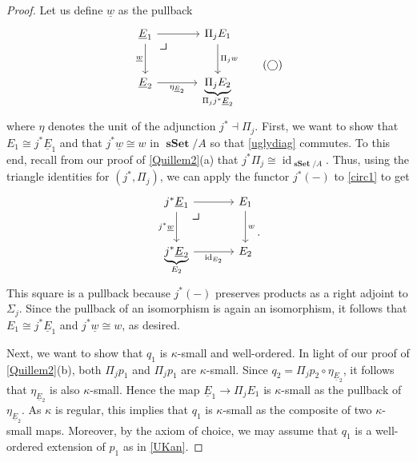 \documentclass[10pt,letterpaper,cm]{nupset}
\theoremstyle{definition}
\theoremstyle{theorem}
\theoremstyle{remark}
\newcommand{\0}{\mathbf{0}}
\newcommand{\1}{\mathbf{1}}
\newcommand{\2}{\mathbf{2}}
\DeclareMathOperator{\sset}{\mathbf{sSet}}
\DeclareMathOperator{\idd}{id}
\begin{document}
\begin{proof}
Let us define $\underline{w}$ as the pullback
\[ \label{circ1}
\begin{tikzcd}[row sep=large, column sep=large]
\underline{E}_1 \arrow[r] \arrow[d, "\underline{w}"'] \arrow[dr, phantom, "\scalebox{1.5}{\color{black}$\lrcorner$}" , very near start, color=black]
& \Pi_j{E_1} \arrow[d, "\Pi_j{w}"]             \\
\underline{E}_2 \arrow[r, "\eta_{\underline{E}_2}"']                 & \underbrace{\Pi_j{E_2}}_{\Pi_jj^{\ast}{\underline{E}_2}}
\end{tikzcd}  \tag{$\bigcirc$}
\] where $\eta$  denotes the unit of the adjunction $j^{\ast} \dashv \Pi_j$.
First, we want to show that $E_1 \cong j^{\ast}{\underline{E}_1}$ and that $j^{\ast}{\underline{w}} \cong w$ in $\sset/A$ so that \eqref{uglydiag} commutes. To this end, recall from our proof of \cref{Quillem2}(a) that $j^{\ast}{\Pi_j}\cong \idd_{\sset/A}$. Thus, using the triangle identities for $\left(j^{\ast}, \Pi_j\right)$, we can apply the functor $j^{\ast}({-})$ to \eqref{circ1} to get
\[
\begin{tikzcd}[row sep=large, column sep=large]
j^{\ast}{\underline{E}_1} \arrow[d, "j^{\ast}{\underline{w}}"'] \arrow[r]  \arrow[dr, phantom, "\scalebox{1.5}{\color{black}$\lrcorner$}" , very near start, color=black]
& E_1 \arrow[d, "w"] \\
\underbrace{j^{\ast}{\underline{E}_2}}_{E_2} \arrow[r, "\idd_{E_2}"']                      & E_2               
\end{tikzcd}
.\] This square is a pullback because $j^{\ast}({-})$ preserves products as a right adjoint to $\Sigma_j$. Since the pullback of an isomorphism is again an isomorphism, it follows that $E_1 \cong j^{\ast}{\underline{E}_1}$ and  $j^{\ast}{\underline{w}} \cong w$, as desired.

\medskip

Next, we want to show that  $q_1$ is $\kappa$-small and well-ordered. In light of our proof of \cref{Quillem2}(b), both $\Pi_j{p_1}$ and $\Pi_j{p_1}$ are $\kappa$-small. Since $q_2 = \Pi_j{p_2}\circ \eta_{\underline{E}_2}$, it follows that  $\eta_{\underline{E}_2}$ is also  $\kappa$-small. Hence the map $\underline{E}_1 \to \Pi_{j}{E_1}$ is $\kappa$-small as the pullback of  $\eta_{\underline{E}_2}$. As $\kappa$ is regular, this implies that $q_1$ is $\kappa$-small as the composite of two $\kappa$-small maps. Moreover, by the axiom of choice, we may assume that $q_1$ is a well-ordered extension of $p_1$ as in \cref{UKan}.

\medskip


\end{proof}
\end{document}
